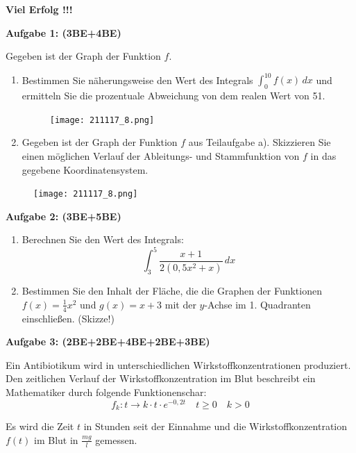 \documentclass[a4paper,12pt]{article}
\newcommand{\Aufgabe}[1]{
  {
  \vspace*{0.5cm}
  \textsf{\textbf{Aufgabe #1}}
  \vspace*{0.2cm}
  
  }
}
\begin{document}
\vspace{5cm}
\centerline{\huge\bfseries\sffamily Viel Erfolg !!!}

\newpage

\Aufgabe{1: (3BE+4BE)} 
Gegeben ist der Graph der Funktion $f$. 
\begin{enumerate}[label={\alph*)}] 
  \item Bestimmen Sie näherungsweise den Wert des Integrals ${\int_{0}^{10} f(x)\, dx}$ und ermitteln Sie die prozentuale Abweichung von dem realen Wert von 51.
\begin{figure}[H]
  \centering
  \texttt{[image: 211117\_8.png]}
\end{figure}
  \item Gegeben ist der Graph der Funktion $f$ aus Teilaufgabe a). Skizzieren Sie einen möglichen Verlauf der Ableitungs- und Stammfunktion von $f$ in das gegebene Koordinatensystem.
\end{enumerate}
\begin{figure}[H]
  \centering
  \texttt{[image: 211117\_8.png]}
\end{figure}


\vspace{3cm}

\Aufgabe{2: (3BE+5BE)} 
\begin{enumerate}[label={\alph*)}] 
  \item Berechnen Sie den Wert des Integrals:
    \[ \int_{3}^{5} \frac{x+1}{2(0,5x^2+x)}\,dx \]
  \item Bestimmen Sie den Inhalt der Fläche, die die Graphen der Funktionen ${f(x)= \frac{1}{4}x^2}$ und ${g(x) = x+3}$ mit der $y$-Achse im 1. Quadranten einschließen. (Skizze!)
\end{enumerate}

\Aufgabe{3: (2BE+2BE+4BE+2BE+3BE)} 
Ein Antibiotikum wird in unterschiedlichen Wirkstoffkonzentrationen produziert. Den zeitlichen Verlauf der Wirkstoffkonzentration im Blut beschreibt ein Mathematiker durch folgende Funktionenschar:
\[f_k: t \rightarrow  k \cdot t \cdot e^{-0,2t} \quad  t\ge0 \quad k>0 \]

Es wird die Zeit $t$ in Stunden seit der Einnahme und die Wirkstoffkonzentration $f(t)$ im Blut in $\frac{mg}{l}$ gemessen.
\end{document}
